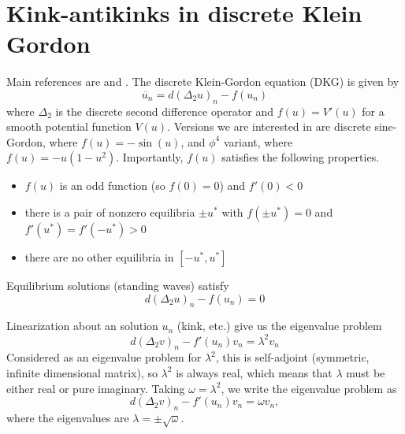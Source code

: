 \documentclass[12pt]{article}
\begin{document}
\section{Kink-antikinks in discrete Klein Gordon}

Main references are \cite{KevrekidisWeinstein2000} and \cite{Kapitula2001}. The discrete Klein-Gordon equation (DKG) is given by
\begin{equation}\label{eq:KG}
\ddot{u_n} = d (\Delta_2 u)_n - f(u_n)
\end{equation}
where $\Delta_2$ is the discrete second difference operator and $f(u) = V'(u)$ for a smooth potential function $V(u)$. Versions we are interested in are discrete sine-Gordon, where $f(u) = -\sin(u)$, and $\phi^4$ variant, where $f(u) = -u(1-u^2)$. Importantly, $f(u)$ satisfies the following properties.
\begin{itemize}
	\item $f(u)$ is an odd function (so $f(0) = 0$) and $f'(0) < 0$
	\item there is a pair of nonzero equilibria $\pm u^*$ with $f(\pm u^*) = 0$ and $f'(u^*) = f'(-u^*) > 0$
	\item there are no other equilibria in $[-u^*, u^*]$
\end{itemize}

Equilibrium solutions (standing waves) satisfy 
\begin{equation}\label{eq:KGeq}
d (\Delta_2 u)_n - f(u_n) = 0
\end{equation}

Linearization about an solution $u_n$ (kink, etc.) give us the eigenvalue problem
\[
d (\Delta_2 v)_n - f'(u_n)v_n = \lambda^2 v_n
\]
Considered as an eigenvalue problem for $\lambda^2$, this is self-adjoint (symmetric, infinite dimensional matrix), so $\lambda^2$ is always real, which means that $\lambda$ must be either real or pure imaginary. Taking $\omega = \lambda^2$, we write the eigenvalue problem as
\begin{equation}\label{eq:evp}
d (\Delta_2 v)_n - f'(u_n)v_n = \omega v_n,
\end{equation}
where the eigenvalues are $\lambda = \pm \sqrt{\omega}$.
\end{document}
